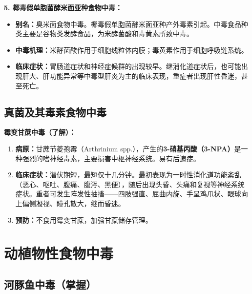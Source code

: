 \begin{defbox}
\textbf{5. 椰毒假单胞菌酵米面亚种食物中毒：}
\begin{itemize}[leftmargin=*]
    \item \textbf{别名：}臭米面食物中毒。椰毒假单胞菌酵米面亚种产外毒素引起。中毒食品种类主要是谷物类发酵食品，为米酵菌酸和毒黄素所致中毒。
    \item \textbf{中毒机理：}米酵菌酸作用于细胞线粒体内膜；毒黄素作用于细胞呼吸链系统。
    \item \textbf{临床症状：}胃肠道症状和神经症候群的出现较早。继消化道症状后，也可能出现肝大、肝功能异常等中毒型肝炎为主的临床表现，重症者出现肝性昏迷，甚至死亡。
\end{itemize}
\end{defbox}

\subsection{真菌及其毒素食物中毒}

\begin{defbox}
\textbf{霉变甘蔗中毒（了解）：}
\begin{enumerate}[leftmargin=*]
    \item \textbf{病原：}甘蔗节菱孢霉（Arthrinium spp.），产生的\textbf{3-硝基丙酸（3-NPA）}是一种强烈的嗜神经毒素，主要损害中枢神经系统。易有后遗症。
    \item \textbf{临床症状：}潜伏期短，最短仅十几分钟。最初表现为一时性消化道功能紊乱（恶心、呕吐、腹痛、腹泻、黑便），随后出现头昏、头痛和复视等神经系统症状。重者可发生阵发性抽搐——四肢强直、屈曲内旋、手呈鸡爪状、眼球向上偏侧凝视、瞳孔散大，继而昏迷。
    \item \textbf{预防：}不食用霉变甘蔗，加强甘蔗储存管理。
\end{enumerate}
\end{defbox}

\section{动植物性食物中毒}

\subsection{河豚鱼中毒（掌握）}

